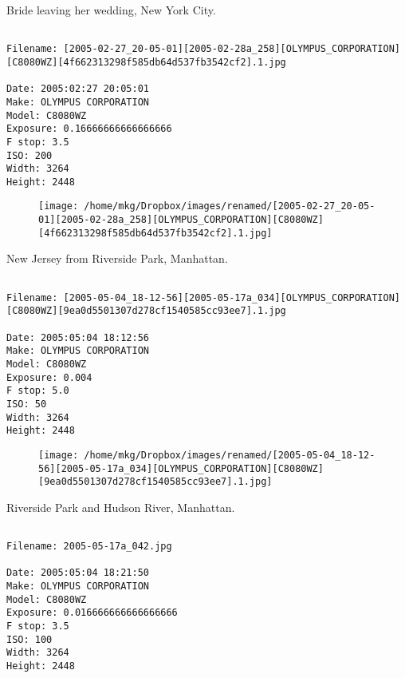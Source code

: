 \clearpage
\onecolumn
\noindent Bride leaving her wedding, New York City.
\noindent
\begin{lstlisting}

Filename: [2005-02-27_20-05-01][2005-02-28a_258][OLYMPUS_CORPORATION][C8080WZ][4f662313298f585db64d537fb3542cf2].1.jpg

Date: 2005:02:27 20:05:01
Make: OLYMPUS CORPORATION
Model: C8080WZ
Exposure: 0.16666666666666666
F stop: 3.5
ISO: 200
Width: 3264
Height: 2448
\end{lstlisting}
\clearpage

\begin{figure}
\texttt{[image: /home/mkg/Dropbox/images/renamed/[2005-02-27\_20-05-01][2005-02-28a\_258][OLYMPUS\_CORPORATION][C8080WZ][4f662313298f585db64d537fb3542cf2].1.jpg]}
\end{figure}
    
\clearpage
\onecolumn
\noindent New Jersey from Riverside Park, Manhattan.
\noindent
\begin{lstlisting}

Filename: [2005-05-04_18-12-56][2005-05-17a_034][OLYMPUS_CORPORATION][C8080WZ][9ea0d5501307d278cf1540585cc93ee7].1.jpg

Date: 2005:05:04 18:12:56
Make: OLYMPUS CORPORATION
Model: C8080WZ
Exposure: 0.004
F stop: 5.0
ISO: 50
Width: 3264
Height: 2448
\end{lstlisting}
\clearpage

\begin{figure}
\texttt{[image: /home/mkg/Dropbox/images/renamed/[2005-05-04\_18-12-56][2005-05-17a\_034][OLYMPUS\_CORPORATION][C8080WZ][9ea0d5501307d278cf1540585cc93ee7].1.jpg]}
\end{figure}
    
\clearpage
\onecolumn
\noindent Riverside Park and Hudson River, Manhattan.
\noindent
\begin{lstlisting}

Filename: 2005-05-17a_042.jpg

Date: 2005:05:04 18:21:50
Make: OLYMPUS CORPORATION
Model: C8080WZ
Exposure: 0.016666666666666666
F stop: 3.5
ISO: 100
Width: 3264
Height: 2448
\end{lstlisting}
\clearpage

